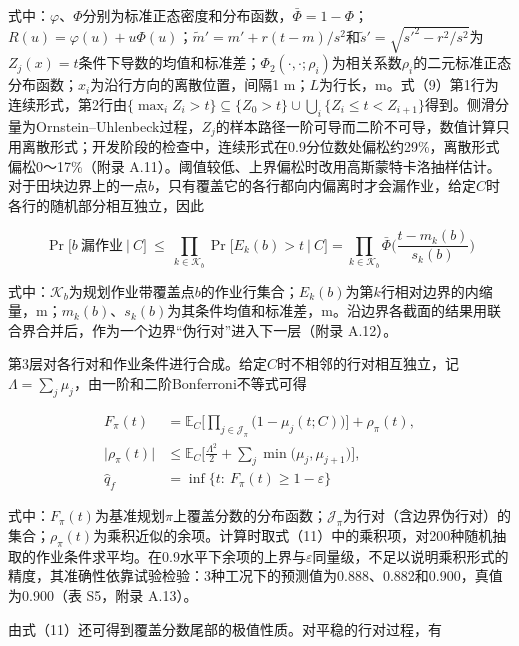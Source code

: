 \documentclass[preprint,12pt,number,sort&compress]{elsarticle}
\begin{document}
式中：\(\varphi\)、\(\Phi\)分别为标准正态密度和分布函数，\(\bar\Phi=1-\Phi\)；\(R(u)=\varphi(u)+u\Phi(u)\)；\(\tilde m'=m'+r(t-m)/s^2\)和\(\tilde s'=\sqrt{s'^2-r^2/s^2}\)为\(Z_j(x)=t\)条件下导数的均值和标准差；\(\Phi_2(\cdot,\cdot;\rho_i)\)为相关系数\(\rho_i\)的二元标准正态分布函数；\(x_i\)为沿行方向的离散位置，间隔1 m；\(L\)为行长，m。式（9）第1行为连续形式，第2行由\(\{\max_iZ_i>t\}\subseteq\{Z_0>t\}\cup\bigcup_i\{Z_i\le t<Z_{i+1}\}\)得到。侧滑分量为Ornstein--Uhlenbeck过程，\(Z_j\)的样本路径一阶可导而二阶不可导，数值计算只用离散形式；开发阶段的检查中，连续形式在0.9分位数处偏松约29\%，离散形式偏松0～17\%（附录 A.11）。阈值较低、上界偏松时改用高斯蒙特卡洛抽样估计。对于田块边界上的一点\(b\)，只有覆盖它的各行都向内偏离时才会漏作业，给定\(C\)时各行的随机部分相互独立，因此

\begin{equation}
\Pr\big[b\ \text{漏作业}\ \big|\ C\big]\ \le\ \prod_{k\in\mathcal K_b}\Pr\big[E_k(b)>t\ \big|\ C\big]=\prod_{k\in\mathcal K_b}\bar\Phi\Big(\frac{t-m_k(b)}{s_k(b)}\Big)
\end{equation}

式中：\(\mathcal K_b\)为规划作业带覆盖点\(b\)的作业行集合；\(E_k(b)\)为第\(k\)行相对边界的内缩量，m；\(m_k(b)\)、\(s_k(b)\)为其条件均值和标准差，m。沿边界各截面的结果用联合界合并后，作为一个边界``伪行对''进入下一层（附录 A.12）。

第3层对各行对和作业条件进行合成。给定\(C\)时不相邻的行对相互独立，记\(\Lambda=\sum_j\mu_j\)，由一阶和二阶Bonferroni不等式可得

\begin{equation}
\begin{aligned}
F_\pi(t)&=\mathbb E_C\Big[\prod_{j\in\mathcal J_\pi}\big(1-\mu_j(t;C)\big)\Big]+\rho_\pi(t),\\
\big|\rho_\pi(t)\big|&\le\mathbb E_C\Big[\frac{\Lambda^2}{2}+\sum_j\min\big(\mu_j,\mu_{j+1}\big)\Big],\\
\hat q_f&=\inf\big\{t:\ F_\pi(t)\ge1-\varepsilon\big\}
\end{aligned}
\end{equation}

式中：\(F_\pi(t)\)为基准规划\(\pi\)上覆盖分数的分布函数；\(\mathcal J_\pi\)为行对（含边界伪行对）的集合；\(\rho_\pi(t)\)为乘积近似的余项。计算时取式（11）中的乘积项，对200种随机抽取的作业条件求平均。在0.9水平下余项的上界与\(\varepsilon\)同量级，不足以说明乘积形式的精度，其准确性依靠试验检验：3种工况下的预测值为0.888、0.882和0.900，真值为0.900（表 S5，附录 A.13）。

由式（11）还可得到覆盖分数尾部的极值性质。对平稳的行对过程，有
\end{document}
